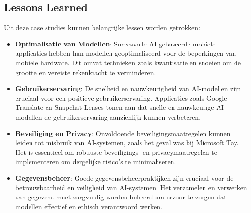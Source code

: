\subsection{Lessons Learned}

Uit deze case studies kunnen belangrijke lessen worden getrokken:

\begin{itemize}
    \item \textbf{Optimalisatie van Modellen}: Succesvolle AI-gebaseerde mobiele applicaties hebben hun modellen geoptimaliseerd voor de beperkingen van mobiele \hfill \break hardware. Dit omvat technieken zoals kwantisatie en snoeien om de grootte en vereiste rekenkracht te verminderen.
    
    \item \textbf{Gebruikerservaring}: De snelheid en nauwkeurigheid van AI-modellen zijn cruciaal voor een positieve gebruikerservaring. Applicaties zoals Google Translate en Snapchat Lenses tonen aan dat snelle en nauwkeurige AI-modellen de gebruikerservaring aanzienlijk kunnen verbeteren.
    
    \item \textbf{Beveiliging en Privacy}: Onvoldoende beveiligingsmaatregelen kunnen leiden tot misbruik van AI-systemen, zoals het geval was bij Microsoft Tay. Het is essentieel om robuuste beveiligings- en privacymaatregelen te implementeren om dergelijke risico's te minimaliseren.
    
    \item \textbf{Gegevensbeheer}: Goede gegevensbeheerpraktijken zijn cruciaal voor de betrouwbaarheid en veiligheid van AI-systemen. Het verzamelen en verwerken van gegevens moet zorgvuldig worden beheerd om ervoor te zorgen dat modellen effectief en ethisch verantwoord werken.
\end{itemize}
